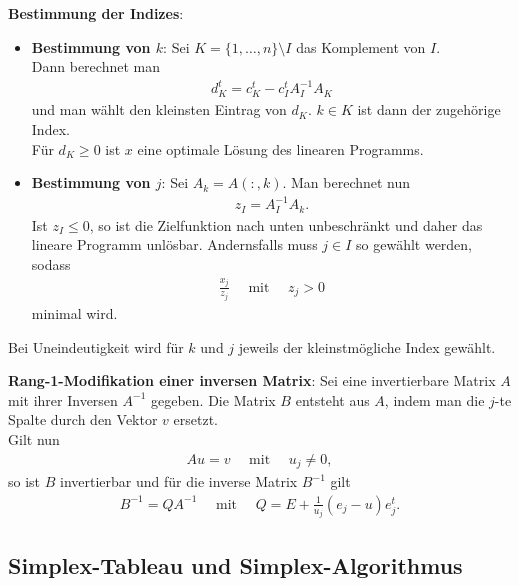 \textbf{Bestimmung der Indizes}:
\begin{itemize}
    \item
    \textbf{Bestimmung von $k$}:
    Sei $K = \{1, \dotsc, n\} \setminus I$ das Komplement von $I$. \\
    Dann berechnet man
    \begin{align*}
        d_K^t = c_K^t - c_I^t A_I^{-1} A_K
    \end{align*}
    und man wählt den kleinsten Eintrag von $d_K$.
    $k \in K$ ist dann der zugehörige Index. \\
    Für $d_K \ge 0$ ist $x$ eine optimale Lösung des linearen Programms.

    \item
    \textbf{Bestimmung von $j$}:
    Sei $A_k = A(:, k)$.
    Man berechnet nun
    \begin{align*}
        z_I = A_I^{-1} A_k.
    \end{align*}
    Ist $z_I \le 0$, so ist die Zielfunktion nach unten unbeschränkt
    und daher das lineare Programm unlösbar.
    Andernsfalls muss $j \in I$ so gewählt werden, sodass
    \begin{align*}
        \frac{x_j}{z_j} \quad\text{ mit }\quad z_j > 0
    \end{align*}
    minimal wird.
\end{itemize}
Bei Uneindeutigkeit wird für $k$ und $j$ jeweils der kleinstmögliche Index
gewählt.

\linie

\textbf{Rang-1-Modifikation einer inversen Matrix}:
Sei eine invertierbare Matrix $A$ mit ihrer Inversen $A^{-1}$ gegeben.
Die Matrix $B$ entsteht aus $A$, indem man die $j$-te Spalte durch den
Vektor $v$ ersetzt. \\
Gilt nun
\begin{align*}
    Au = v \quad\text{ mit }\quad u_j \not= 0,
\end{align*}
so ist $B$ invertierbar und für die inverse Matrix $B^{-1}$ gilt
\begin{align*}
    B^{-1} = QA^{-1} \quad\text{ mit }\quad
    Q = E + \frac{1}{u_j} (e_j - u) e_j^t.
\end{align*}

\pagebreak

\subsection{%
    Simplex-Tableau und Simplex-Algorithmus%
}

